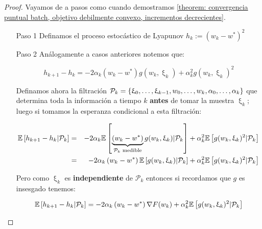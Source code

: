 \begin{proof}
	Vayamos de a pasos como cuando demostramos \ref{theorem: convergencia puntual batch, objetivo debilmente convexo, incrementos decrecientes}.
	
	\begin{enumerate}
		\item [Paso 1] Definamos el proceso estoc\'astico de Lyapunov $h_k := \left(w_k - w^*\right)^2$
		
		\item [Paso 2] An\'alogamente a casos anteriores notemos que:
		
		\begin{equation}
			h_{k+1} - h_k = -2 \alpha_k \left(w_k - w^*\right) g(w_k, \upxi_{k}) + \alpha_k^2 g(w_k, \upxi_{k})^2
		\end{equation}
		
		
		
		Definamos ahora la filtraci\'on $\mathcal{P}_k = \left\lbrace\upxi_{0}, \dots, \upxi_{k-1}, w_0, \dots, w_k, \alpha_0, \dots, \alpha_k\right\rbrace$ que determina toda la informaci\'on a tiempo $k$ \textbf{antes} de tomar la muestra $\upxi_{k}$; luego si tomamos la esperanza condicional a esta filtraci\'on:
		
		\begin{equation*}
		\begin{aligned}
			\mathbb{E} \left[{h_{k+1} - h_k } \vert \mathcal{P}_{k}\right] & = & -2 \alpha_k \mathbb{E} \left[{\underbrace{\left(w_k - w^*\right)}_{\mathcal{P}_k \text{ medible}} g(w_k, \upxi_{k}) } \vert \mathcal{P}_{k}\right] + \alpha_k^2 \mathbb{E} \left[{g(w_k, \upxi_{k})^2} \vert \mathcal{P}_{k}\right] \\
			& = & -2 \alpha_k \left(w_k - w^*\right) \mathbb{E} \left[{g(w_k, \upxi_{k})} \vert \mathcal{P}_{k}\right] + \alpha_k^2 \mathbb{E} \left[{g(w_k, \upxi_{k})^2} \vert \mathcal{P}_{k}\right] 
		\end{aligned}
		\end{equation*}
		
		Pero como $\upxi_{k}$ es \textbf{independiente } de $\mathcal{P}_k$ entonces si recordamos que $g$ es insesgado tenemos:
		
		\begin{equation*}
		\mathbb{E} \left[{h_{k+1} - h_k } \vert \mathcal{P}_{k}\right] = -2 \alpha_k \left(w_k - w^*\right) \nabla F(w_k) + \alpha_k^2 \mathbb{E} \left[{g(w_k, \upxi_{k})^2} \vert \mathcal{P}_{k}\right] 
		\end{equation*}		
		

\end{enumerate}
\end{proof}

